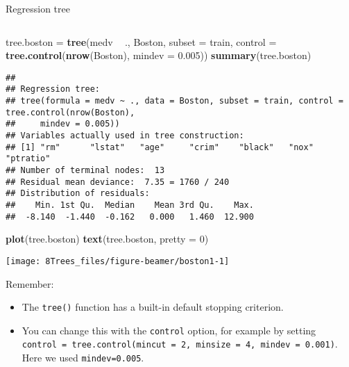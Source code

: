\documentclass[10pt,ignorenonframetext,]{beamer}
\newenvironment{Shaded}{\begin{snugshade}}{\end{snugshade}}
\newcommand{\DataTypeTok}[1]{\textcolor[rgb]{0.13,0.29,0.53}{#1}}
\newcommand{\DecValTok}[1]{\textcolor[rgb]{0.00,0.00,0.81}{#1}}
\newcommand{\FloatTok}[1]{\textcolor[rgb]{0.00,0.00,0.81}{#1}}
\newcommand{\KeywordTok}[1]{\textcolor[rgb]{0.13,0.29,0.53}{\textbf{#1}}}
\newcommand{\NormalTok}[1]{#1}
\newcommand{\OperatorTok}[1]{\textcolor[rgb]{0.81,0.36,0.00}{\textbf{#1}}}
\newcommand{\StringTok}[1]{\textcolor[rgb]{0.31,0.60,0.02}{#1}}
\providecommand{\tightlist}{%
  \setlength{\itemsep}{0pt}\setlength{\parskip}{0pt}}
\begin{document}
\begin{frame}[fragile]

\begin{block}{Regression tree}

\(~\)

\scriptsize

\begin{Shaded}
\begin{Highlighting}[]
\NormalTok{tree.boston =}\StringTok{ }\KeywordTok{tree}\NormalTok{(medv }\OperatorTok{~}\StringTok{ }\NormalTok{., Boston, }\DataTypeTok{subset =}\NormalTok{ train, }\DataTypeTok{control =} \KeywordTok{tree.control}\NormalTok{(}\KeywordTok{nrow}\NormalTok{(Boston), }
    \DataTypeTok{mindev =} \FloatTok{0.005}\NormalTok{))}
\KeywordTok{summary}\NormalTok{(tree.boston)}
\end{Highlighting}
\end{Shaded}

\begin{verbatim}
## 
## Regression tree:
## tree(formula = medv ~ ., data = Boston, subset = train, control = tree.control(nrow(Boston), 
##     mindev = 0.005))
## Variables actually used in tree construction:
## [1] "rm"      "lstat"   "age"     "crim"    "black"   "nox"     "ptratio"
## Number of terminal nodes:  13 
## Residual mean deviance:  7.35 = 1760 / 240 
## Distribution of residuals:
##    Min. 1st Qu.  Median    Mean 3rd Qu.    Max. 
##  -8.140  -1.440  -0.162   0.000   1.460  12.900
\end{verbatim}

\end{block}

\end{frame}

\begin{frame}[fragile]

\scriptsize

\begin{Shaded}
\begin{Highlighting}[]
\KeywordTok{plot}\NormalTok{(tree.boston)}
\KeywordTok{text}\NormalTok{(tree.boston, }\DataTypeTok{pretty =} \DecValTok{0}\NormalTok{)}
\end{Highlighting}
\end{Shaded}

\begin{center}\texttt{[image: 8Trees\_files/figure-beamer/boston1-1]} \end{center}

\normalsize

Remember:

\begin{itemize}
\tightlist
\item
  The \texttt{tree()} function has a built-in default stopping
  criterion.
\item
  You can change this with the \texttt{control} option, for example by
  setting
  \texttt{control\ =\ tree.control(mincut\ =\ 2,\ minsize\ =\ 4,\ mindev\ =\ 0.001)}.
  Here we used \texttt{mindev=0.005}.
\end{itemize}

\end{frame}
\end{document}
